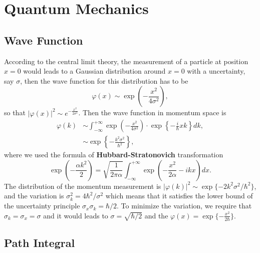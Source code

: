 \section{Quantum Mechanics}

\subsection{Wave Function}

According to the central limit theory, the measurement of a particle at position $x=0$ would leads to a Gaussian distribution around $x=0$ with a uncertainty, say $\sigma$, then the wave function for this distribution has to be 
\begin{equation}
\varphi(x)\sim \exp\left(-\frac{x^2}{4\sigma^2}\right),
\end{equation}
so that $|\varphi(x)|^2\sim e^{-\frac{x^2}{2\sigma^2}}$. Then the wave function in momentum space is
\begin{equation}
\begin{aligned}
\varphi(k)&\sim\int_{-\infty}^{+\infty}\exp\left(-\frac{x^2}{4\sigma^2}\right)\cdot\exp\left\{-\frac{i}{\hbar}xk\right\}dk,\\
&\sim \exp\left\{-\frac{k^2\sigma^2}{\hbar^2}\right\},
\end{aligned}
\end{equation}
where we used the formula of \textbf{Hubbard-Stratonovich} transformation
\begin{equation}
\exp\left(-\frac{\alpha k^2}{2}\right)=\sqrt{\frac{1}{2\pi\alpha}}\int_{-\infty}^{+\infty}\exp\left(-\frac{x^2}{2\alpha}-ikx\right)dx.
\end{equation}
The distribution of the momentum measurement is $|\varphi(k)|^2\sim \exp\{-2k^2\sigma^2/\hbar^2\}$, and the variation is $\sigma_k^2= 4\hbar^2/\sigma^2$ which means that it satisfies the lower bound of the uncertainty principle $\sigma_x\sigma_k=\hbar/2$. To minimize the variation, we require that $\sigma_k=\sigma_x=\sigma$ and it would leads to $\sigma=\sqrt{\hbar/2}$ and the $\varphi(x)=\exp\{-\frac{x^2}{2\hbar}\}$.


\subsection{Path Integral}
